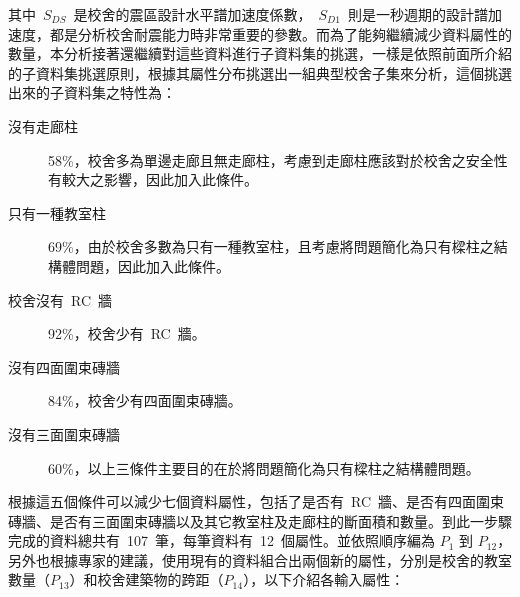 其中~$S_{DS}$~是校舍的震區設計水平譜加速度係數，~$S_{D1}$~則是一秒週期的設計譜加速度，都是分析校舍耐震能力時非常重要的參數。而為了能夠繼續減少資料屬性的數量，本分析接著還繼續對這些資料進行子資料集的挑選，一樣是依照前面所介紹的子資料集挑選原則，根據其屬性分布挑選出一組典型校舍子集來分析，這個挑選出來的子資料集之特性為：

\begin{description}
\item [沒有走廊柱] 58\%，校舍多為單邊走廊且無走廊柱，考慮到走廊柱應該對於校舍之安全性有較大之影響，因此加入此條件。
\item [只有一種教室柱] 69\%，由於校舍多數為只有一種教室柱，且考慮將問題簡化為只有樑柱之結構體問題，因此加入此條件。
\item [校舍沒有~RC~牆] 92\%，校舍少有~RC~牆。
\item [沒有四面圍束磚牆] 84\%，校舍少有四面圍束磚牆。
\item [沒有三面圍束磚牆] 60\%，以上三條件主要目的在於將問題簡化為只有樑柱之結構體問題。
\end{description}

根據這五個條件可以減少七個資料屬性，包括了是否有~RC~牆、是否有四面圍束磚牆、是否有三面圍束磚牆以及其它教室柱及走廊柱的斷面積和數量。到此一步驟完成的資料總共有~107~筆，每筆資料有~12~個屬性。並依照順序編為 $P_1$ 到 $P_{12}$，另外也根據專家的建議，使用現有的資料組合出兩個新的屬性，分別是校舍的教室數量（$P_{13}$）和校舍建築物的跨距（$P_{14}$），以下介紹各輸入屬性：

